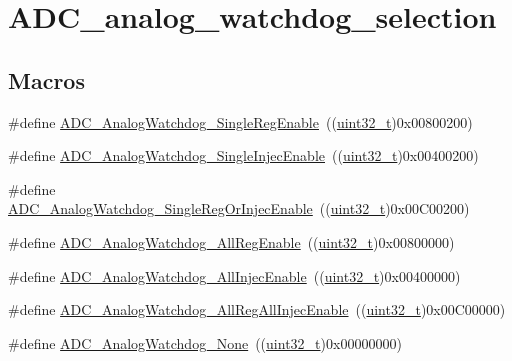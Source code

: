 \hypertarget{group___a_d_c__analog__watchdog__selection}{}\section{A\+D\+C\+\_\+analog\+\_\+watchdog\+\_\+selection}
\label{group___a_d_c__analog__watchdog__selection}
\subsection*{Macros}
\begin{DoxyCompactItemize}
\item 
\#define \hyperlink{group___a_d_c__analog__watchdog__selection_ga2975552a752f44085d9da54b4e76121e}{A\+D\+C\+\_\+\+Analog\+Watchdog\+\_\+\+Single\+Reg\+Enable}~((\hyperlink{_p_e___types_8h_a33594304e786b158f3fb30289278f5af}{uint32\+\_\+t})0x00800200)
\item 
\#define \hyperlink{group___a_d_c__analog__watchdog__selection_gaa9904271617ab69593ac68ae540047fb}{A\+D\+C\+\_\+\+Analog\+Watchdog\+\_\+\+Single\+Injec\+Enable}~((\hyperlink{_p_e___types_8h_a33594304e786b158f3fb30289278f5af}{uint32\+\_\+t})0x00400200)
\item 
\#define \hyperlink{group___a_d_c__analog__watchdog__selection_gaffd35fc6ceb226ec3fb61fb52227820c}{A\+D\+C\+\_\+\+Analog\+Watchdog\+\_\+\+Single\+Reg\+Or\+Injec\+Enable}~((\hyperlink{_p_e___types_8h_a33594304e786b158f3fb30289278f5af}{uint32\+\_\+t})0x00\+C00200)
\item 
\#define \hyperlink{group___a_d_c__analog__watchdog__selection_ga37f08e1a4a452a2c148341b3cfcdeb1e}{A\+D\+C\+\_\+\+Analog\+Watchdog\+\_\+\+All\+Reg\+Enable}~((\hyperlink{_p_e___types_8h_a33594304e786b158f3fb30289278f5af}{uint32\+\_\+t})0x00800000)
\item 
\#define \hyperlink{group___a_d_c__analog__watchdog__selection_gae4d6a7ebb136d924f0c8bad2cbac0574}{A\+D\+C\+\_\+\+Analog\+Watchdog\+\_\+\+All\+Injec\+Enable}~((\hyperlink{_p_e___types_8h_a33594304e786b158f3fb30289278f5af}{uint32\+\_\+t})0x00400000)
\item 
\#define \hyperlink{group___a_d_c__analog__watchdog__selection_ga25a299f4493aaae316521351198df084}{A\+D\+C\+\_\+\+Analog\+Watchdog\+\_\+\+All\+Reg\+All\+Injec\+Enable}~((\hyperlink{_p_e___types_8h_a33594304e786b158f3fb30289278f5af}{uint32\+\_\+t})0x00\+C00000)
\item 
\#define \hyperlink{group___a_d_c__analog__watchdog__selection_ga91f69979e0e449fef5a8b225a21e3eb9}{A\+D\+C\+\_\+\+Analog\+Watchdog\+\_\+\+None}~((\hyperlink{_p_e___types_8h_a33594304e786b158f3fb30289278f5af}{uint32\+\_\+t})0x00000000)

\end{DoxyCompactItemize}

